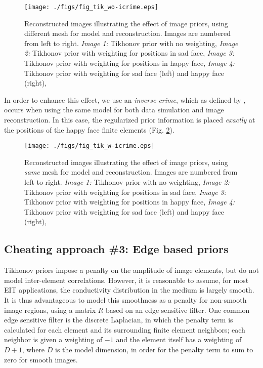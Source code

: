 \documentclass[12pt]{iopart}
\begin{document}
%
%
\begin{figure}[th]
\begin{flushright}
\texttt{[image: ./figs/fig\_tik\_wo-icrime.eps]}
\caption{\small 
Reconstructed images illustrating the effect of image priors,
using different mesh for model and reconstruction.
Images are numbered from left to right.
{\em Image 1:} Tikhonov prior with no weighting,
{\em Image 2:} Tikhonov prior with weighting for positions in sad face,
{\em Image 3:} Tikhonov prior with weighting for positions in happy face,
{\em Image 4:} Tikhonov prior with weighting for sad face (left) and
happy face (right),
 }
 \label{fig:tikprior}
\end{flushright}
\end{figure}

In order to enhance this effect, we use an {\em inverse crime},
which as defined by \cite{Colton_and_Kress_1992}, occurs when
using the same model for both data simulation and image reconstruction.
In this case, the regularized prior information is placed
{\em exactly} at the positions of the happy face finite elements
(Fig. \ref{fig:tikprior_icrime}).

%
%
\begin{figure}[th]
\begin{flushright}
\texttt{[image: ./figs/fig\_tik\_w-icrime.eps]}
\caption{\small 
Reconstructed images illustrating the effect of image priors,
using {\em same} mesh for model and reconstruction.
Images are numbered from left to right.
{\em Image 1:} Tikhonov prior with no weighting,
{\em Image 2:} Tikhonov prior with weighting for positions in sad face,
{\em Image 3:} Tikhonov prior with weighting for positions in happy face,
{\em Image 4:} Tikhonov prior with weighting for sad face (left) and
happy face (right),
 }
 \label{fig:tikprior_icrime}
\end{flushright}
\end{figure}


\subsection{ Cheating approach \#3:
             Edge based priors}

Tikhonov priors impose a penalty on the amplitude of image
elements, but do not model inter-element correlations. 
However, it is reasonable to assume, for most EIT applications,
the conductivity distribution in the medium is largely
smooth. It is thus advantageous to model this smoothness
as a penalty for non-smooth image regions, using a
matrix $R$ based on an edge sensitive filter.
One common edge sensitive filter is the discrete Laplacian,
in which the penalty term is calculated for each element
and its surrounding finite element neighbors; each
neighbor is given a weighting of $-1$ and the element itself
has a weighting of $D+1$, where $D$ is the model dimension,
in order for the penalty term to sum to zero for smooth
images.
\end{document}
